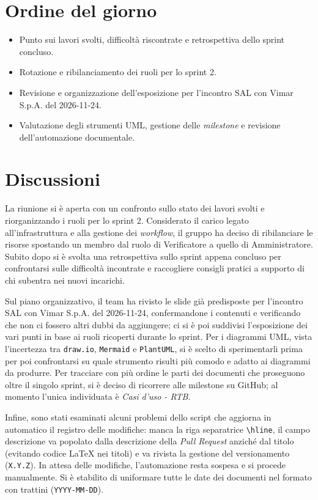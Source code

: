 \documentclass[11pt, a4paper]{article}
\begin{document}
\section{Ordine del giorno}
\begin{itemize}
    \item Punto sui lavori svolti, difficoltà riscontrate e retrospettiva dello sprint concluso.
    \item Rotazione e ribilanciamento dei ruoli per lo sprint 2.
    \item Revisione e organizzazione dell'esposizione per l'incontro SAL con Vimar S.p.A. del 2026-11-24.
    \item Valutazione degli strumenti UML, gestione delle \textit{milestone} e revisione dell'automazione documentale.
\end{itemize}

\section{Discussioni}
La riunione si è aperta con un confronto sullo stato dei lavori svolti e riorganizzando i ruoli per lo sprint 2. Considerato il carico legato all'infrastruttura e alla gestione dei \textit{workflow}, il gruppo ha deciso di ribilanciare le risorse spostando un membro dal ruolo di Verificatore a quello di Amministratore. Subito dopo si è svolta una retrospettiva sullo sprint appena concluso per confrontarsi sulle difficoltà incontrate e raccogliere consigli pratici a supporto di chi subentra nei nuovi incarichi.

\noindent Sul piano organizzativo, il team ha rivisto le slide già predisposte per l'incontro SAL con Vimar S.p.A. del 2026-11-24, confermandone i contenuti e verificando che non ci fossero altri dubbi da aggiungere; ci si è poi suddivisi l'esposizione dei vari punti in base ai ruoli ricoperti durante lo sprint. Per i diagrammi UML, vista l'incertezza tra \texttt{draw.io}, \texttt{Mermaid} e \texttt{PlantUML}, si è scelto di sperimentarli prima per poi confrontarsi su quale strumento risulti più comodo e adatto ai diagrammi da produrre. Per tracciare con più ordine le parti dei documenti che proseguono oltre il singolo sprint, si è deciso di ricorrere alle milestone su GitHub; al momento l'unica individuata è \textit{Casi d'uso - RTB}.

\noindent Infine, sono stati esaminati alcuni problemi dello script che aggiorna in automatico il registro delle modifiche: manca la riga separatrice \texttt{\textbackslash hline}, il campo descrizione va popolato dalla descrizione della \textit{Pull Request} anziché dal titolo (evitando codice LaTeX nei titoli) e va rivista la gestione del versionamento (\texttt{X.Y.Z}). In attesa delle modifiche, l'automazione resta sospesa e si procede manualmente. Si è stabilito di uniformare tutte le date dei documenti nel formato con trattini (\texttt{YYYY-MM-DD}).
\end{document}
